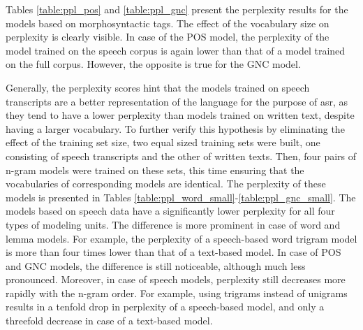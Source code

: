Tables \ref{table:ppl_pos} and \ref{table:ppl_gnc} present the perplexity results for the models based on morphosyntactic tags. The effect of the vocabulary size on perplexity is clearly visible. In case of the POS model, the perplexity of the model trained on the speech corpus is again lower than that of a model trained on the full corpus. However, the opposite is true for the GNC model. 

Generally, the perplexity scores hint that the models trained on speech transcripts are a better representation of the language for the purpose of \gls{asr}, as they tend to have a lower perplexity than models trained on written text, despite having a larger vocabulary. To further verify this hypothesis by eliminating the effect of the training set size, two equal sized training sets were built, one consisting of speech transcripts and the other of written texts. Then, four pairs of n-gram models were trained on these sets, this time ensuring that the vocabularies of corresponding models are identical. The perplexity of these models is presented in Tables \ref{table:ppl_word_small}-\ref{table:ppl_gnc_small}. The models based on speech data have a significantly lower perplexity for all four types of modeling units. The difference is more prominent in case of word and lemma models. For example, the perplexity of a speech-based word trigram model is more than four times lower than that of a text-based model. In case of POS and GNC models, the difference is still noticeable, although much less pronounced. Moreover, in case of speech models, perplexity still decreases more rapidly with the n-gram order. For example, using trigrams instead of unigrams results in a tenfold drop in perplexity of a speech-based model, and only a threefold decrease in case of a text-based model. 

